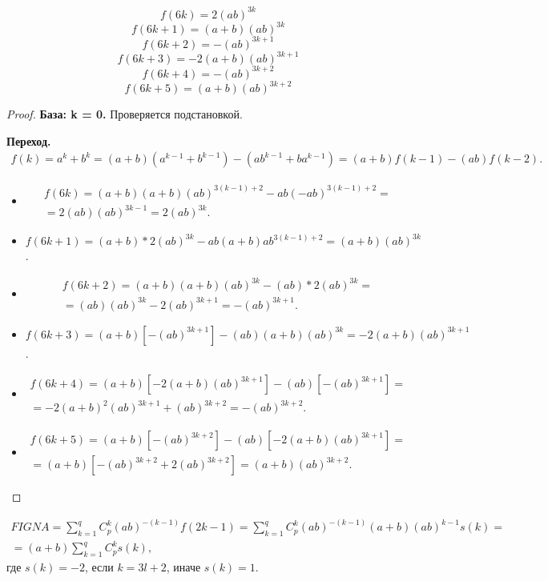 {\theorem 
$$ f(6k)    = 2(ab)^{3k}        $$
$$ f(6k+1)  = (a+b)(ab)^{3k}    $$
$$ f(6k+2)  = -(ab)^{3k+1}      $$
$$ f(6k+3)  = -2(a+b)(ab)^{3k+1}$$
$$ f(6k+4)  = -(ab)^{3k+2}      $$
$$ f(6k+5)  = (a+b)(ab)^{3k+2}  $$
}
\begin{proof}

{\bfseries База: k = 0.}
Проверяется подстановкой.

{\bfseries Переход. }
\begin{multline*}
    f(k) = a^k + b^k = (a+b)(a^{k-1} + b^{k-1}) - (ab^{k-1} + ba^{k-1}) = (a+b)f(k-1) - (ab)f(k-2).
\end{multline*}
\begin{itemize}
    \item 
        \begin{multline*}
            f(6k) = (a+b)(a+b)(ab)^{3(k-1)+2} - ab(-ab)^{3(k-1)+2} = \\
            = 2(ab)(ab)^{3k-1} = 2(ab)^{3k}.
        \end{multline*}
    \item $f(6k+1) = (a+b) * 2(ab)^{3k} - ab(a+b)ab^{3(k-1)+2} = (a+b)(ab)^{3k}$.
    \item 
        \begin{multline*}
            f(6k+2) = (a+b)(a+b)(ab)^{3k} - (ab)*2(ab)^{3k} = \\
            = (ab)(ab)^{3k} - 2(ab)^{3k+1} = -(ab)^{3k+1}.
        \end{multline*}
    \item $f(6k+3) = (a+b)[-(ab)^{3k+1}] - (ab)(a+b)(ab)^{3k} = -2(a+b)(ab)^{3k+1}$.
    \item 
        \begin{multline*}
            f(6k+4) = (a+b)[-2(a+b)(ab)^{3k+1}] - (ab)[-(ab)^{3k+1}] = \\
            = -2(a+b)^2(ab)^{3k+1} + (ab)^{3k+2} = -(ab)^{3k+2}.
        \end{multline*}
    \item 
        \begin{multline*}
            f(6k+5) = (a+b)[-(ab)^{3k+2}] - (ab)[-2(a+b)(ab)^{3k+1}] = \\
            = (a+b)[-(ab)^{3k+2} + 2(ab)^{3k+2}] = (a+b)(ab)^{3k+2}.
        \end{multline*}        
\end{itemize}
\end{proof}

\begin{multline*}
    FIGNA = \sum_{k=1}^q{C_p^k (ab)^{-(k-1)} f(2k-1)} = \sum_{k=1}^q{C_p^k (ab)^{-(k-1)} (a+b)(ab)^{k-1}s(k)} = \\
    = (a+b) \sum_{k=1}^q{C_p^k}s(k),
\end{multline*}
где $s(k) = -2$, если $k = 3l+2$, иначе $s(k) = 1$.
